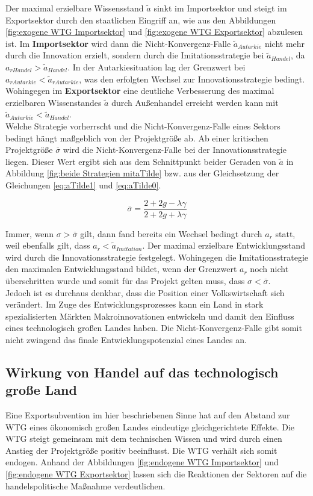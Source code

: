 Der maximal erzielbare Wissensstand $\tilde{a}$ sinkt im Importsektor  und steigt im Exportsektor durch den staatlichen Eingriff an, wie aus den Abbildungen \ref{fig:exogene WTG Importsektor} und \ref{fig:exogene WTG Exportsektor} abzulesen ist. Im \textbf{Importsektor} wird dann die Nicht-Konvergenz-Falle $\tilde{a}_{Autarkie}$ nicht mehr durch die Innovation erzielt, sondern durch die \textcolor[rgb]{0,0.32,0}{Imitationsstrategie} bei $\tilde{a}_{Handel}$, da $a_{rHandel}>\tilde{a}_{Handel}$. In der Autarkiesituation lag der Grenzwert bei $a_{rAutarkie}<\tilde{a}_{rAutarkie}$, was den erfolgten Wechsel zur \textcolor[rgb]{0.74,0.97,0.22}{Innovationsstrategie} bedingt. Wohingegen im \textbf{Exportsektor} eine deutliche Verbesserung des maximal erzielbaren Wissenstandes $\tilde{a}$ durch Au{\ss}enhandel erreicht werden kann mit $\tilde{a}_{Autarkie}<\tilde{a}_{Handel}$.\\
Welche Strategie vorherrscht und die Nicht-Konvergenz-Falle eines Sektors bedingt hängt ma{\ss}geblich von der Projektgrö{\ss}e ab. Ab einer kritischen Projektgrö{\ss}e $\overline{\sigma}$ wird die Nicht-Konvergenz-Falle bei der Innovationsstrategie liegen. Dieser Wert ergibt sich aus dem Schnittpunkt beider Geraden von $\tilde{a}$ in Abbildung \ref{fig:beide Strategien mitaTilde} bzw. aus der Gleichsetzung der Gleichungen \ref{eq:aTilde1} und \ref{eq:aTilde0}.


	\begin{equation} 
		\overline{\sigma}=\frac{2+2g-\lambda\gamma}{2+2g+\lambda\gamma}
	\end{equation} 


Immer, wenn $\sigma>\overline{\sigma}$ gilt, dann fand bereits ein Wechsel bedingt durch $a_r$ statt, weil ebenfalls gilt, dass $a_r<\tilde{a}_{Imitation}$. Der maximal erzielbare Entwicklungsstand wird durch die Innovationsstrategie festgelegt. Wohingegen die Imitationsstrategie den maximalen Entwicklungsstand bildet, wenn der Grenzwert $a_r$ noch nicht überschritten wurde und somit für das Projekt gelten muss, dass $\sigma<\overline{\sigma}$.\\
Jedoch ist es durchaus denkbar, dass die Position einer Volkswirtschaft sich verändert. Im Zuge des Entwicklungsprozesses kann ein Land in stark spezialisierten Märkten Makroinnovationen entwickeln und damit den Einfluss eines technologisch gro{\ss}en Landes haben. Die Nicht-Konvergenz-Falle gibt somit nicht zwingend das finale Entwicklungspotenzial eines Landes an. 


\subsection{Wirkung von Handel auf das technologisch gro{\ss}e Land}
Eine Exportsubvention im hier beschriebenen Sinne hat auf den Abstand zur WTG eines ökonomisch gro{\ss}en Landes eindeutige gleichgerichtete Effekte. Die WTG steigt gemeinsam mit dem technischen Wissen und wird durch einen Anstieg der Projektgrö{\ss}e positiv beeinflusst. Die WTG verhält sich somit endogen.  
Anhand der Abbildungen \ref{fig:endogene WTG Importsektor} und \ref{fig:endogene WTG Exportsektor} lassen sich die Reaktionen der Sektoren auf die handelspolitische Ma{\ss}nahme verdeutlichen.\\


